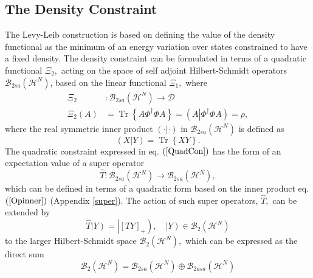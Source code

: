 \documentclass[aps,preprint]{revtex4}%
\begin{document}
\subsection{The Density Constraint\label{DenCon}}

The Levy-Leib construction \cite{Levy1979,Lieb1983} is based on defining the
value of the density functional as the minimum of an energy variation over
states constrained to have a fixed density. The density constraint can be
formulated in terms of a quadratic functional $\Xi_{2},$ acting on the space
of self adjoint Hilbert-Schmidt operators $\mathcal{B}_{2sa}\left(
\mathcal{H}^{N}\right)  $, based on the linear functional $\Xi_{1},$ where
\begin{align}
\Xi_{2}  &  :\mathcal{B}_{2sa}\left(  \mathcal{H}^{N}\right)  \rightarrow
\mathcal{D}\nonumber\\
\Xi_{2}\left(  A\right)   &  =\operatorname{Tr}\left\{  A\Phi^{\dagger}\Phi
A\right\}  =\left(  A\left\vert \Phi^{\dagger}\Phi A\right.  \right)  =\rho,
\label{QuadCon}%
\end{align}
where the real symmetric inner product $\left(  \cdot\left\vert \cdot\right.
\right)  $ in $\mathcal{B}_{2sa}\left(  \mathcal{H}^{N}\right)  $ is defined
as
\begin{equation}
\left(  X\left\vert Y\right.  \right)  =\operatorname{Tr}\left\{  XY\right\}
. \label{Opinner}%
\end{equation}
The quadratic constraint expressed in eq. $\left(  \ref{QuadCon}\right)  $ has
the form of an expectation value of a super operator
\begin{equation}
\widehat{T}:\mathcal{B}_{2sa}\left(  \mathcal{H}^{N}\right)  \rightarrow
\mathcal{B}_{2sa}\left(  \mathcal{H}^{N}\right)  ,
\end{equation}
which can be defined in terms of a quadratic form based on the inner product
eq. $\left(  \ref{Opinner}\right)  $ (Appendix \ref{super}). The action of
such super operators, $\widehat{T},$ can be extended by
\begin{equation}
\widehat{T}\left\vert Y\right)  =\left\vert \left[  TY\right]  _{+}\right)
,\quad\left\vert Y\right)  \in\mathcal{B}_{2}\left(  \mathcal{H}^{N}\right)
\end{equation}
to the larger Hilbert-Schmidt space $\mathcal{B}_{2}\left(  \mathcal{H}%
^{N}\right)  ,$ which can be expressed as the direct sum
\begin{equation}
\mathcal{B}_{2}\left(  \mathcal{H}^{N}\right)  =\mathcal{B}_{2sa}\left(
\mathcal{H}^{N}\right)  \oplus\mathcal{B}_{2asa}\left(  \mathcal{H}%
^{N}\right)
\end{equation}
\end{document}

